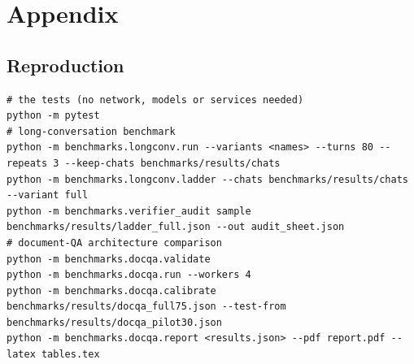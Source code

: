 \section{Appendix}
\subsection*{Reproduction}
\begin{small}\begin{verbatim}
# the tests (no network, models or services needed)
python -m pytest
# long-conversation benchmark
python -m benchmarks.longconv.run --variants <names> --turns 80 --repeats 3 --keep-chats benchmarks/results/chats
python -m benchmarks.longconv.ladder --chats benchmarks/results/chats --variant full
python -m benchmarks.verifier_audit sample benchmarks/results/ladder_full.json --out audit_sheet.json
# document-QA architecture comparison
python -m benchmarks.docqa.validate
python -m benchmarks.docqa.run --workers 4
python -m benchmarks.docqa.calibrate benchmarks/results/docqa_full75.json --test-from benchmarks/results/docqa_pilot30.json
python -m benchmarks.docqa.report <results.json> --pdf report.pdf --latex tables.tex
\end{verbatim}\end{small}
